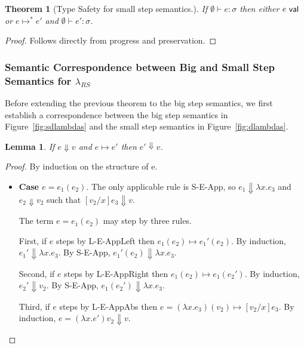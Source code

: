 \documentclass[11pt,leqno]{article}
\newtheorem{trthm}[tr]{Theorem}
\newtheorem{trlem}[tr]{Lemma}
\theoremstyle{definition}
\newcommand{\lambdas}{\lambda_{RS}}
\newcommand{\val}{{\sf val}}
\newcommand{\sreduces}{ \Downarrow }
\begin{document}
\begin{trthm}[Type Safety for small step semantics.] \label{thm:sstypesafte}
If $\emptyset\vdash e : \sigma$ then either $e \ \val$ or $e \mapsto^* e'$ and $\emptyset\vdash e' : \sigma$.
\end{trthm}
\begin{proof}
Follows directly from progress and preservation.
\end{proof}




\subsubsection{Semantic Correspondence between Big and Small Step Semantics for $\lambdas$}

Before extending the previous theorem to the big step semantics, we first establish a correspondence between
the big step semantics in Figure~\ref{fig:sdlambdas} and the small step semantics in Figure~\ref{fig:dlambdas}.


\begin{trlem} \label{lem:inductive}
If $e \sreduces v$ and $e \mapsto e'$ then $e' \sreduces v$. 
\end{trlem}
\begin{proof}
By induction on the structure of e.
\begin{itemize}[label=$ $,itemsep=1ex]

\item \textbf{Case $e = e_1(e_2)$}.
The only applicable rule is S-E-App, so $e_1 \sreduces \lambda x . e_3$
and $e_2 \sreduces v_2$ such that $[v_2/x] e_3 \sreduces v$.

The term $e = e_1(e_2)$ may step by three rules.

First, if $e$ steps by L-E-AppLeft then $e_1(e_2) \mapsto e_1'(e_2)$.
By induction, $e_1' \sreduces \lambda x . e_3$.
By S-E-App, $e_1'(e_2) \sreduces \lambda x . e_3$.

Second, if $e$ steps by L-E-AppRight then $e_1(e_2) \mapsto e_1(e_2')$.
By induction, $e_2' \sreduces v_2$.
By S-E-App, $e_1(e_2') \sreduces \lambda x . e_3$.

Third, if $e$ steps by L-E-AppAbs then $e = (\lambda x . e_3)(v_2) \mapsto [v_2 / x]e_3$.
By induction, $e = (\lambda x . e')v_2 \sreduces v$.
\end{itemize}
\end{proof}
\end{document}
